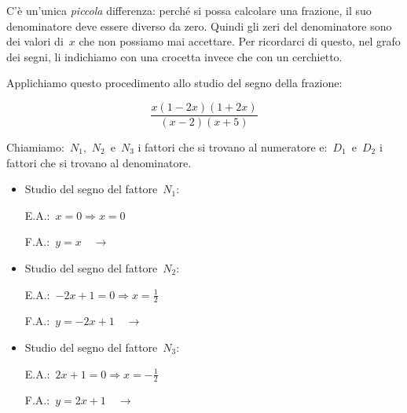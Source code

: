C'è un'unica \emph{piccola} differenza: perché si possa calcolare una frazione, 
il suo denominatore deve essere diverso da zero. Quindi gli zeri del 
denominatore sono dei valori di~$x$ che non possiamo mai accettare. 
Per ricordarci di questo, nel grafo dei segni, li indichiamo con una crocetta 
invece che con un cerchietto.

 \begin{esempio}
Applichiamo questo procedimento allo studio del segno della frazione:

\[\frac{x(1 -2 x)(1 + 2 x)}{(x -2)(x +5)}\]

Chiamiamo:~$N_1$,~$N_2$~e~$N_3$ i fattori che si trovano al numeratore 
e:~$D_1$~e~$D_2$ i fattori che si trovano al denominatore.

\begin{itemize} [noitemsep]
 \item Studio del segno del fattore~$N_1$:\\
 \begin{minipage}{.45\textwidth}
  E.A.:~$x=0 \Rightarrow x=0$
 \end{minipage}
 \begin{minipage}{.25\textwidth}
  F.A.:~$y = x \quad \rightarrow$
 \end{minipage}
 \begin{minipage}{.3\textwidth}
  
 \end{minipage}
 \item Studio del segno del fattore~$N_2$:\\
 \begin{minipage}{.45\textwidth}
  E.A.:~$-2 x +1=0 \Rightarrow x=\frac{1}{2}$
 \end{minipage}
 \begin{minipage}{.25\textwidth}
  F.A.:~$y = -2 x +1 \quad \rightarrow$
 \end{minipage}
 \begin{minipage}{.3\textwidth}
  
 \end{minipage}
 \item Studio del segno del fattore~$N_3$:\\
 \begin{minipage}{.45\textwidth}
  E.A.:~$2 x +1=0 \Rightarrow x=- \frac{1}{2}$
 \end{minipage}
 \begin{minipage}{.25\textwidth}
  F.A.:~$y=2 x +1 \quad \rightarrow$
 \end{minipage}

\end{itemize}
\end{esempio}
